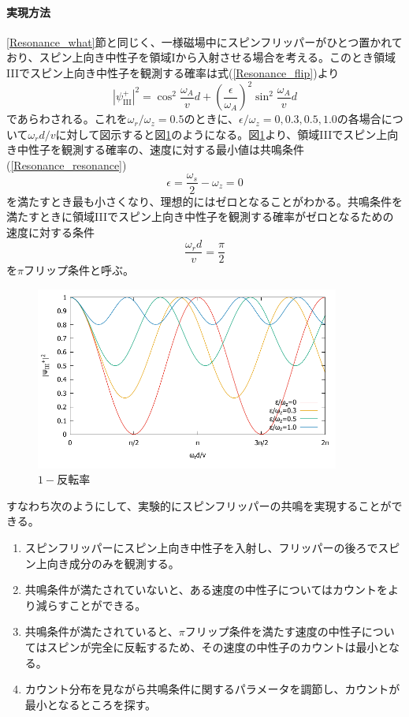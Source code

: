 \paragraph{実現方法}
\ref{Resonance_what}節と同じく、一様磁場中にスピンフリッパーがひとつ置かれており、スピン上向き中性子を領域Iから入射させる場合を考える。このとき領域IIIでスピン上向き中性子を観測する確率は式(\ref{Resonance_flip})より
\begin{equation}
|\psi_\mathrm{III}^+|^2 =\cos^2 \frac{\omega_A}{v}d+\left(\frac{\epsilon}{\omega_A}\right)^2\sin^2\frac{\omega_A}{v}d
\end{equation}
であらわされる。これを$\omega_r/\omega_z=0.5$のときに、$\epsilon/\omega_z=0,0.3,0.5,1.0$の各場合について$\omega_r d/v$に対して図示すると図\ref{Resonance_fig_1-reversal}のようになる。図\ref{Resonance_fig_1-reversal}より、領域IIIでスピン上向き中性子を観測する確率の、速度に対する最小値は共鳴条件(\ref{Resonance_resonance})
\[
\epsilon=\frac{\omega_s}{2}-\omega_z=0
\]
を満たすとき最も小さくなり、理想的にはゼロとなることがわかる。共鳴条件を満たすときに領域IIIでスピン上向き中性子を観測する確率がゼロとなるための速度に対する条件
\begin{equation}
\frac{\omega_rd}{v}=\frac{\pi}{2}
\end{equation}
を$\pi$フリップ条件と呼ぶ。
\begin{figure}[h]
\begin{center}
\includegraphics[width=10cm]{resonance/whatwhyhow/resonance_1-reversal.pdf}
\caption{$1-反転率$}
\label{Resonance_fig_1-reversal}
\end{center}
\end{figure}

すなわち次のようにして、実験的にスピンフリッパーの共鳴を実現することができる。
\begin{enumerate}
\item スピンフリッパーにスピン上向き中性子を入射し、フリッパーの後ろでスピン上向き成分のみを観測する。
\item 共鳴条件が満たされていないと、ある速度の中性子についてはカウントをより減らすことができる。
\item 共鳴条件が満たされていると、$\pi$フリップ条件を満たす速度の中性子についてはスピンが完全に反転するため、その速度の中性子のカウントは最小となる。
\item カウント分布を見ながら共鳴条件に関するパラメータを調節し、カウントが最小となるところを探す。
\end{enumerate}


